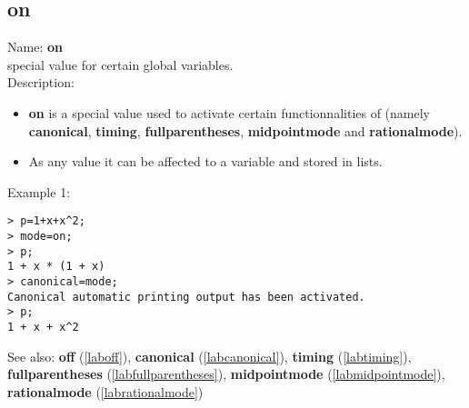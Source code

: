 \subsection{on}
\label{labon}
\noindent Name: \textbf{on}\\
special value for certain global variables.\\
\noindent Description: \begin{itemize}

\item \textbf{on} is a special value used to activate certain functionnalities of \sollya
   (namely \textbf{canonical}, \textbf{timing}, \textbf{fullparentheses}, \textbf{midpointmode} and \textbf{rationalmode}).

\item As any value it can be affected to a variable and stored in lists.
\end{itemize}
\noindent Example 1: 
\begin{center}\begin{minipage}{15cm}\begin{Verbatim}[frame=single]
> p=1+x+x^2;
> mode=on;
> p;
1 + x * (1 + x)
> canonical=mode;
Canonical automatic printing output has been activated.
> p;
1 + x + x^2
\end{Verbatim}
\end{minipage}\end{center}
See also: \textbf{off} (\ref{laboff}), \textbf{canonical} (\ref{labcanonical}), \textbf{timing} (\ref{labtiming}), \textbf{fullparentheses} (\ref{labfullparentheses}), \textbf{midpointmode} (\ref{labmidpointmode}), \textbf{rationalmode} (\ref{labrationalmode})

